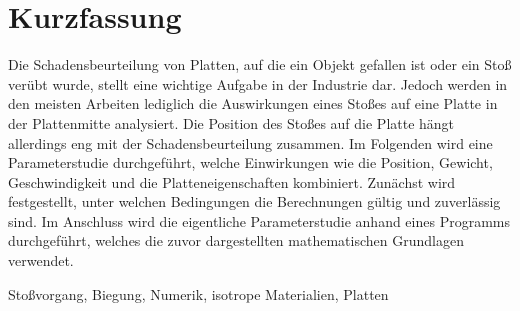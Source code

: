 \chapter*{Kurzfassung} 


Die Schadensbeurteilung von Platten, auf die ein Objekt gefallen ist oder ein Stoß verübt wurde, stellt eine wichtige Aufgabe in der Industrie dar. Jedoch werden in den meisten Arbeiten lediglich die Auswirkungen eines Stoßes auf eine Platte in der Plattenmitte analysiert. Die Position des Stoßes auf die Platte hängt allerdings eng mit der Schadensbeurteilung zusammen. Im Folgenden wird eine Parameterstudie durchgeführt, welche Einwirkungen wie die Position, Gewicht, Geschwindigkeit und die Platteneigenschaften kombiniert. Zunächst wird festgestellt, unter welchen Bedingungen die Berechnungen gültig und zuverlässig sind. Im Anschluss wird die eigentliche Parameterstudie anhand eines Programms durchgeführt, welches die zuvor dargestellten mathematischen Grundlagen verwendet.
\begin{keywords}
Stoßvorgang, Biegung, Numerik, isotrope Materialien, Platten
\end{keywords}